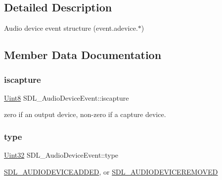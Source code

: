 \subsection{Detailed Description}
Audio device event structure (event.\+adevice.$\ast$) 

\subsection{Member Data Documentation}
\mbox{\label{struct_s_d_l___audio_device_event_a1482dcd50b47046ef8e9bfa7cc7457d9}} 
\subsubsection{\texorpdfstring{iscapture}{iscapture}}
{\footnotesize\ttfamily \hyperlink{_s_d_l__stdinc_8h_a2944638813a090aa23e62f4da842c3e2}{Uint8} S\+D\+L\+\_\+\+Audio\+Device\+Event\+::iscapture}

zero if an output device, non-\/zero if a capture device. \mbox{\label{struct_s_d_l___audio_device_event_ae68c3bd49b49608711a17395c7cbfe58}} 
\subsubsection{\texorpdfstring{type}{type}}
{\footnotesize\ttfamily \hyperlink{_s_d_l__stdinc_8h_add440eff171ea5f55cb00c4a9ab8672d}{Uint32} S\+D\+L\+\_\+\+Audio\+Device\+Event\+::type}

\hyperlink{_s_d_l__events_8h_a3b589e89be6b35c02e0dd34a55f3fccaadb3154654baf003910e75d74b507a82b}{S\+D\+L\+\_\+\+A\+U\+D\+I\+O\+D\+E\+V\+I\+C\+E\+A\+D\+D\+ED}, or \hyperlink{_s_d_l__events_8h_a3b589e89be6b35c02e0dd34a55f3fccaad56f8934fe24ee4c0cd9329e3c57c0c2}{S\+D\+L\+\_\+\+A\+U\+D\+I\+O\+D\+E\+V\+I\+C\+E\+R\+E\+M\+O\+V\+ED} \mbox{\label{struct_s_d_l___audio_device_event_ac91d70fd4e1dd596185fed061388896c}} 
